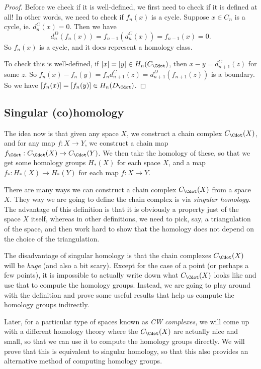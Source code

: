 \documentclass[a4paper]{article}
\begin{document}
\begin{proof}
  Before we check if it is well-defined, we first need to check if it is defined at all! In other words, we need to check if $f_n(x)$ is a cycle. Suppose $x \in C_n$ is a cycle, ie. $d_n^C(x) = 0$. Then we have
  \[
    d_n^D(f_n(x)) = f_{n - 1}(d_n^C(x)) = f_{n - 1}(x) = 0.
  \]
  So $f_n(x)$ is a cycle, and it does represent a homology class.

  To check this is well-defined, if $[x] = [y] \in H_n(C_{\Cdot})$, then $x - y = d_{n + 1}^C(z)$ for some $z$. So $f_n(x) - f_n(y) = f_n d_{n + 1}^C(z) = d_{n + 1}^D (f_{n + 1}(z))$ is a boundary. So we have $[f_n(x)] = [f_n(y)] \in H_n(D_{\Cdot})$.
\end{proof}

\subsection{Singular (co)homology}
The idea now is that given any space $X$, we construct a chain complex $C_\Cdot(X)$, and for any map $f: X \to Y$, we construct a chain map $f_\Cdot: C_\Cdot(X) \to C_\Cdot(Y)$. We then take the homology of these, so that we get some homology groups $H_*(X)$ for each space $X$, and a map $f_*: H_*(X) \to H_*(Y)$ for each map $f: X \to Y$.

There are many ways we can construct a chain complex $C_\Cdot(X)$ from a space $X$. They way we are going to define the chain complex is via \emph{singular homology}. The advantage of this definition is that it is obviously a property just of the space $X$ itself, whereas in other definitions, we need to pick, say, a triangulation of the space, and then work hard to show that the homology does not depend on the choice of the triangulation.

The disadvantage of singular homology is that the chain complexes $C_\Cdot(X)$ will be \emph{huge} (and also a bit scary). Except for the case of a point (or perhaps a few points), it is impossible to actually write down what $C_\Cdot(X)$ looks like and use that to compute the homology groups. Instead, we are going to play around with the definition and prove some useful results that help us compute the homology groups indirectly.

Later, for a particular type of spaces known as \emph{CW complexes}, we will come up with a different homology theory where the $C_{\Cdot}(X)$ are actually nice and small, so that we can use it to compute the homology groups directly. We will prove that this is equivalent to singular homology, so that this also provides an alternative method of computing homology groups.
\end{document}
